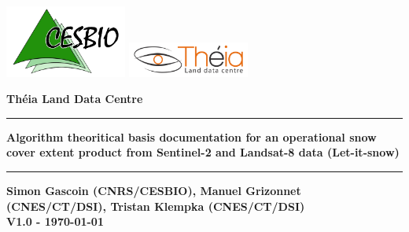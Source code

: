 \begin{titlepage}
\includegraphics[width=0.3\textwidth]{./images/logo_cesbio.png}
\hspace{5cm}
\includegraphics[width=0.3\textwidth]{./images/Theia_en.png}

\vspace{3cm}



\textcolor{PineGreen}{ \huge \bfseries Théia Land Data Centre\\ }
\rule{\linewidth}{0.5mm}
\begin{center}
{ \huge \bfseries Algorithm theoritical basis documentation for an operational snow cover extent product from Sentinel-2 and Landsat-8 data (Let-it-snow)\\}
\rule{\linewidth}{0.5mm}
{ \large \bfseries Simon Gascoin (CNRS/CESBIO), Manuel Grizonnet (CNES/CT/DSI), Tristan Klempka (CNES/CT/DSI)\\ }
{ \large \bfseries V1.0 - \today \\ }



\end{center}
\end{titlepage}
